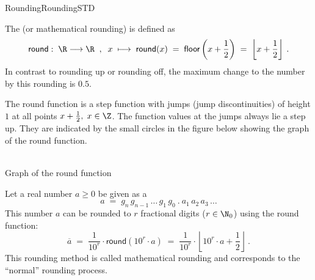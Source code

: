 \begin{MXContent}{Rounding}{Rounding}{STD}
\begin{MInfo}
The  (or mathematical rounding) is defined as
$$
\textsf{round}:\; \R\longrightarrow\R\;\; , \;\;
x\;\longmapsto\; \textsf{round}(x)\;=\; \textsf{floor}\left({x + \frac{1}{2}}\right) \; =\; \left\lfloor{ x + \frac{1}{2} }\right\rfloor\: .
$$
In contrast to rounding up or rounding off, the maximum change to the number by this rounding is $0.5$.
\end{MInfo}

The \textsf{round} function is a step function with jumps (jump discontinuities) of height $1$ at all points $x+\frac{1}{2},\; x\in \Z$. The function values at the jumps always
lie a step up. They are indicated by the small circles in the figure below showing the graph of the \textsf{round} function.

\begin{center}
\\
Graph of the \textsf{round} function
\end{center}

Let a real number $a\geq 0$ be given as a 
$$
a \;=\; g_n\, g_{n-1}\, \ldots\, g_1\, g_0\: .\: a_1\,a_2\, a_3\, \ldots
$$
This number $a$ can be rounded to $r$ fractional digits ($r\in\N_0$) using the \textsf{round} function:
$$
\overline{a}\; =\; \frac{1}{10^{r}}\cdot \textsf{round}(10^{r}\cdot a)\; =\; \frac{1}{10^{r}}\cdot \left\lfloor{ 10^{r}\cdot a + \frac{1}{2} }\right\rfloor\: .
$$
This rounding method is called mathematical rounding and corresponds to the ``normal'' rounding process.


\end{MXContent}
